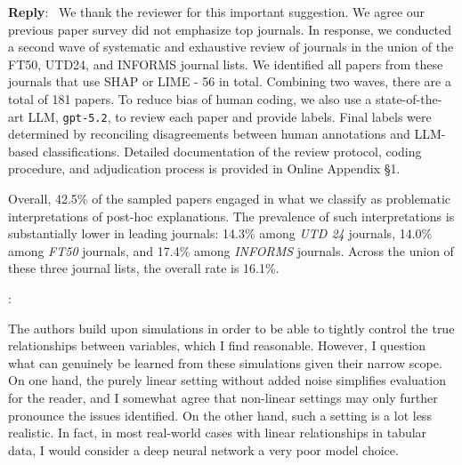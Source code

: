 \documentclass[11pt]{article}
\newcounter{se}[section]
\newcounter{reviewer}
\newcounter{point}[reviewer]
\renewcommand{\thepoint}{R\,\thereviewer.\arabic{point}}
\newenvironment{point}{
    \refstepcounter{point} \bigskip \noindent {\textbf{\thepoint}}: \rmfamily \itshape
}{\medskip}
\newenvironment{reply}
 {\par\medskip \noindent \begin{sf}\textbf{Reply}:\ }
 {\medskip \end{sf}}
\begin{document}
\begin{reply} We thank the reviewer for this important suggestion. We agree our previous paper survey did not emphasize top journals.
In response, we conducted a second wave of systematic and exhaustive review of journals in the union of the FT50, UTD24, and INFORMS journal lists. We identified all papers from these journals that use SHAP or LIME - 56 in total. Combining two waves, there are a total of 181 papers. To reduce bias of human coding, we also use a state-of-the-art LLM, \texttt{gpt-5.2}, to review each paper and provide labels. Final labels were determined by reconciling disagreements between human annotations and LLM-based classifications. Detailed documentation of the review protocol, coding procedure, and adjudication process is provided in Online Appendix \S 1.

Overall, 42.5\% of the sampled papers engaged in what we classify as problematic interpretations of post-hoc explanations. The prevalence of such interpretations is substantially lower in leading journals: 14.3\% among \textit{UTD 24} journals, 14.0\% among \textit{FT50} journals, and 17.4\% among \textit{INFORMS} journals. Across the union of these three journal lists, the overall rate is 16.1\%.





\end{reply}

\begin{point}
The authors build upon simulations in order to be able to tightly control the true relationships between variables, which I find reasonable. However, I question what can genuinely be learned from these simulations given their narrow scope. On one hand, the purely linear setting without added noise simplifies evaluation for the reader, and I somewhat agree that non-linear settings may only further pronounce the issues identified. On the other hand, such a setting is a lot less realistic. In fact, in most real-world cases with linear relationships in tabular data, I would consider a deep neural network a very poor model choice.
\end{point}
\end{document}

